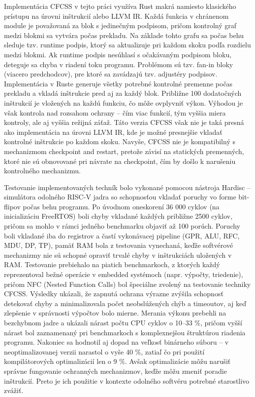 \documentclass[12pt, letterpaper]{article}
\begin{document}
Implementácia CFCSS v tejto práci využíva Rust makrá namiesto klasického prístupu na úrovni inštrukcií alebo LLVM IR. Každá funkcia v chránenom module je považovaná za blok s jedinečným podpisom, pričom kontrolný graf medzi blokmi sa vytvára počas prekladu. Na základe tohto grafu sa počas behu sleduje tzv. runtime podpis, ktorý sa aktualizuje pri každom skoku podľa rozdielu medzi blokmi. Ak runtime podpis nesúhlasí s očakávaným podpisom bloku, deteguje sa chyba v riadení toku programu. Problémom sú tzv. fan-in bloky (viacero predchodcov), pre ktoré sa zavádzajú tzv. adjustéry podpisov. Implementácia v Ruste generuje všetky potrebné kontrolné premenne počas prekladu a vkladá inštrukcie pred aj za každý blok. Približne 100 dodatočných inštrukcií je vložených na každú funkciu, čo môže ovplyvniť výkon. Výhodou je však kontrola nad rozsahom ochrany – čím viac funkcií, tým vyššia miera kontroly, ale aj vyššia režijná záťaž. Táto verzia CFCSS však nie je taká presná ako implementácia na úrovni LLVM IR, kde je možné presnejšie vkladať kontrolné inštrukcie po každom skoku. Navyše, CFCSS nie je kompatibilný s mechanizmom checkpoint and restart, pretože závisí na statických premenných, ktoré nie sú obnovované pri návrate na checkpoint, čím by došlo k narušeniu kontrolného mechanizmu.

Testovanie implementovaných techník bolo vykonané pomocou nástroja Hardisc – simulátora odolného RISC-V jadra so schopnosťou vkladať poruchy vo forme bit-flipov počas behu programu. Po úvodnom oneskorení 36 000 cyklov (na inicializáciu FreeRTOS) boli chyby vkladané každých približne 2500 cyklov, pričom sa mohlo v rámci jedného benchmarku objaviť až 100 porúch. Poruchy boli vkladané iba do registrov a častí vykonávacej pipeline (GPR, ALU, RFC, MDU, DP, TP), pamäť RAM bola z testovania vynechaná, keďže softvérové mechanizmy nie sú schopné opraviť trvalé chyby v inštrukciách uložených v RAM. Testovanie prebiehalo na piatich benchmarkoch, z ktorých každý reprezentoval bežné operácie v embedded systémoch (napr. výpočty, triedenie), pričom NFC (Nested Function Calls) bol špeciálne zvolený na testovanie techniky CFCSS. Výsledky ukázali, že zapnutá ochrana výrazne zvýšila schopnosť detekovať chyby a minimalizovala počet neobslúžených chýb a timeoutov, aj keď zlepšenie v správnosti výpočtov bolo mierne. Merania výkonu prebehli na bezchybnom jadre a ukázali nárast počtu CPU cyklov o 10–33 \%, pričom vyšší nárast bol zaznamenaný pri benchmarkoch s komplexnejšou štruktúrou riadenia programu. Nakoniec sa hodnotil aj dopad na veľkosť binárneho súboru – v neoptimalizovanej verzii narastol o vyše 40 \%, zatiaľ čo pri použití kompilátorových optimalizácií len o 9 \%. Avšak optimalizácie môžu narušiť správne fungovanie ochranných mechanizmov, keďže môžu zmeniť poradie inštrukcií. Preto je ich použitie v kontexte odolného softvéru potrebné starostlivo zvážiť.
\end{document}
